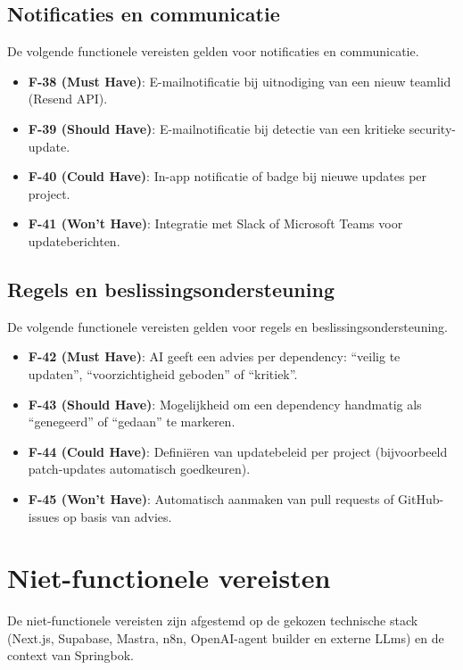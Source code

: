 \subsection{Notificaties en communicatie}
\label{sec:notificaties}

De volgende functionele vereisten gelden voor notificaties en communicatie.

\begin{itemize}
  \item \textbf{F-38 (Must Have)}: E-mailnotificatie bij uitnodiging van een nieuw teamlid (Resend API).
  \item \textbf{F-39 (Should Have)}: E-mailnotificatie bij detectie van een kritieke security-update.
  \item \textbf{F-40 (Could Have)}: In-app notificatie of badge bij nieuwe updates per project.
  \item \textbf{F-41 (Won't Have)}: Integratie met Slack of Microsoft Teams voor updateberichten.
\end{itemize}


\subsection{Regels en beslissingsondersteuning}
\label{sec:regels-beslissing}

De volgende functionele vereisten gelden voor regels en beslissingsondersteuning.

\begin{itemize}
  \item \textbf{F-42 (Must Have)}: AI geeft een advies per dependency: ``veilig te updaten'', ``voorzichtigheid geboden'' of ``kritiek''.
  \item \textbf{F-43 (Should Have)}: Mogelijkheid om een dependency handmatig als ``genegeerd'' of ``gedaan'' te markeren.
  \item \textbf{F-44 (Could Have)}: Definiëren van updatebeleid per project (bijvoorbeeld patch-updates automatisch goedkeuren).
  \item \textbf{F-45 (Won't Have)}: Automatisch aanmaken van pull requests of GitHub-issues op basis van advies.
\end{itemize}


\section{Niet-functionele vereisten}
\label{sec:niet-functionele-vereisten}

De niet-functionele vereisten zijn afgestemd op de gekozen technische stack (Next.js, Supabase, Mastra, n8n, OpenAI-agent builder en externe LLms) en de context van Springbok.

